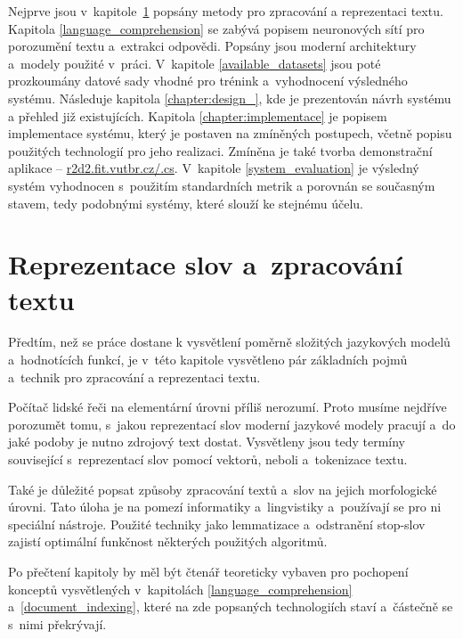 Nejprve jsou v~kapitole~\ref{text_processing} popsány metody pro zpracování a reprezentaci textu. Kapitola \ref{language_comprehension} se zabývá popisem neuronových sítí pro porozumění textu a~extrakci odpovědi. Popsány jsou moderní architektury a~modely použité v~práci. V~kapitole \ref{available_datasets} jsou poté prozkoumány datové sady vhodné pro trénink a~vyhodnocení výsledného systému. Následuje kapitola \ref{chapter:design_}, kde je prezentován návrh systému a přehled již existujících. Kapitola \ref{chapter:implementace} je popisem implementace systému, který je postaven na zmíněných postupech, včetně popisu použitých technologií pro jeho realizaci. Zmíněna je také tvorba demonstrační aplikace -- \href{http://r2d2.fit.vutbr.cz/.cs}{r2d2.fit.vutbr.cz/.cs}. V~kapitole \ref{system_evaluation} je výsledný systém vyhodnocen s~použitím standardních metrik a porovnán se současným stavem, tedy podobnými systémy, které slouží ke stejnému účelu.


\chapter{Reprezentace slov a~zpracování textu}
\label{text_processing}

Předtím, než se práce dostane k vysvětlení poměrně složitých jazykových modelů a~hodnotících funkcí, je v~této kapitole vysvětleno pár základních pojmů a~technik pro zpracování a reprezentaci textu.\par 
Počítač lidské řeči na elementární úrovni příliš nerozumí. Proto musíme nejdříve porozumět tomu, s~jakou reprezentací slov moderní jazykové modely pracují a~do jaké podoby je nutno zdrojový text dostat. Vysvětleny jsou tedy termíny související s~reprezentací slov pomocí vektorů, neboli  a~tokenizace textu.\par 
Také je důležité popsat způsoby zpracování textů a~slov na jejich morfologické úrovni. Tato úloha je na pomezí informatiky a~lingvistiky a~používají se pro ni speciální nástroje. Použité techniky jako lemmatizace a~odstranění stop-slov zajistí optimální funkčnost některých použitých algoritmů.\par
Po přečtení kapitoly by měl být čtenář teoreticky vybaven pro pochopení konceptů vysvětlených v~kapitolách \ref{language_comprehension} a~\ref{document_indexing}, které na zde popsaných technologiích staví a~částečně se s~nimi překrývají.

